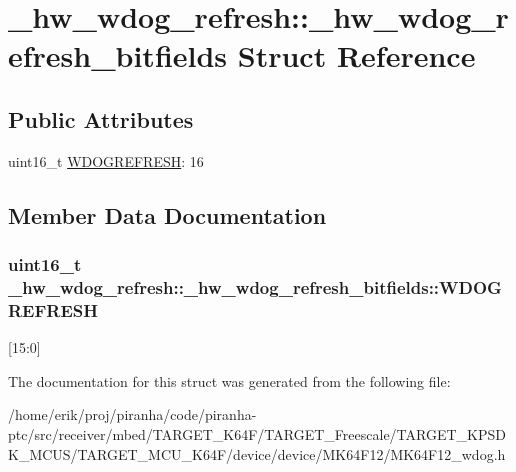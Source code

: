 \hypertarget{struct__hw__wdog__refresh_1_1__hw__wdog__refresh__bitfields}{}\section{\+\_\+hw\+\_\+wdog\+\_\+refresh\+:\+:\+\_\+hw\+\_\+wdog\+\_\+refresh\+\_\+bitfields Struct Reference}
\label{struct__hw__wdog__refresh_1_1__hw__wdog__refresh__bitfields}
\subsection*{Public Attributes}
\begin{DoxyCompactItemize}
\item 
uint16\+\_\+t \hyperlink{struct__hw__wdog__refresh_1_1__hw__wdog__refresh__bitfields_ad23242525d02445b6c2555da4a538e21}{W\+D\+O\+G\+R\+E\+F\+R\+E\+SH}\+: 16
\end{DoxyCompactItemize}


\subsection{Member Data Documentation}
\subsubsection[{\texorpdfstring{W\+D\+O\+G\+R\+E\+F\+R\+E\+SH}{WDOGREFRESH}}]{\setlength{\rightskip}{0pt plus 5cm}uint16\+\_\+t \+\_\+hw\+\_\+wdog\+\_\+refresh\+::\+\_\+hw\+\_\+wdog\+\_\+refresh\+\_\+bitfields\+::\+W\+D\+O\+G\+R\+E\+F\+R\+E\+SH}\hypertarget{struct__hw__wdog__refresh_1_1__hw__wdog__refresh__bitfields_ad23242525d02445b6c2555da4a538e21}{}\label{struct__hw__wdog__refresh_1_1__hw__wdog__refresh__bitfields_ad23242525d02445b6c2555da4a538e21}
\mbox{[}15\+:0\mbox{]} 

The documentation for this struct was generated from the following file\+:\begin{DoxyCompactItemize}
\item 
/home/erik/proj/piranha/code/piranha-\/ptc/src/receiver/mbed/\+T\+A\+R\+G\+E\+T\+\_\+\+K64\+F/\+T\+A\+R\+G\+E\+T\+\_\+\+Freescale/\+T\+A\+R\+G\+E\+T\+\_\+\+K\+P\+S\+D\+K\+\_\+\+M\+C\+U\+S/\+T\+A\+R\+G\+E\+T\+\_\+\+M\+C\+U\+\_\+\+K64\+F/device/device/\+M\+K64\+F12/M\+K64\+F12\+\_\+wdog.\+h\end{DoxyCompactItemize}
